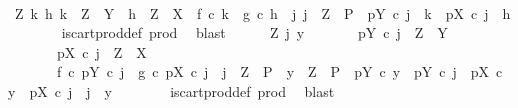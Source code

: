 \begin{isabellebody}
\ \ \ \ \isamarkupfalse%
\ {\isachardoublequoteopen}{\isasymAnd}Z\ k\ h{\isachardot}{\kern0pt}\ k\ {\isacharcolon}{\kern0pt}\ Z\ {\isasymrightarrow}\ Y\ {\isasymLongrightarrow}\ h\ {\isacharcolon}{\kern0pt}\ Z\ {\isasymrightarrow}\ X\ {\isasymLongrightarrow}\ f\ {\isasymcirc}\isactrlsub c\ k\ {\isacharequal}{\kern0pt}\ g\ {\isasymcirc}\isactrlsub c\ h\ {\isasymLongrightarrow}\ {\isasymexists}j{\isachardot}{\kern0pt}\ j\ {\isacharcolon}{\kern0pt}\ Z\ {\isasymrightarrow}\ P\ {\isasymand}\ pY\ {\isasymcirc}\isactrlsub c\ j\ {\isacharequal}{\kern0pt}\ k\ {\isasymand}\ pX\ {\isasymcirc}\isactrlsub c\ j\ {\isacharequal}{\kern0pt}\ h{\isachardoublequoteclose}\isanewline
\ \ \ \ \ \ \isamarkupfalse%
\ is{\isacharunderscore}{\kern0pt}cart{\isacharunderscore}{\kern0pt}prod{\isacharunderscore}{\kern0pt}def\ prod\ \isamarkupfalse%
\ blast\isanewline
\ \ \ \ \isamarkupfalse%
\ {\isachardoublequoteopen}{\isasymAnd}Z\ j\ y{\isachardot}{\kern0pt}\isanewline
\ \ \ \ \ \ \ pY\ {\isasymcirc}\isactrlsub c\ j\ {\isacharcolon}{\kern0pt}\ Z\ {\isasymrightarrow}\ Y\ {\isasymLongrightarrow}\isanewline
\ \ \ \ \ \ \ pX\ {\isasymcirc}\isactrlsub c\ j\ {\isacharcolon}{\kern0pt}\ Z\ {\isasymrightarrow}\ X\ {\isasymLongrightarrow}\isanewline
\ \ \ \ \ \ \ f\ {\isasymcirc}\isactrlsub c\ pY\ {\isasymcirc}\isactrlsub c\ j\ {\isacharequal}{\kern0pt}\ g\ {\isasymcirc}\isactrlsub c\ pX\ {\isasymcirc}\isactrlsub c\ j\ {\isasymLongrightarrow}\ j\ {\isacharcolon}{\kern0pt}\ Z\ {\isasymrightarrow}\ P\ {\isasymLongrightarrow}\ y\ {\isacharcolon}{\kern0pt}\ Z\ {\isasymrightarrow}\ P\ {\isasymLongrightarrow}\ pY\ {\isasymcirc}\isactrlsub c\ y\ {\isacharequal}{\kern0pt}\ pY\ {\isasymcirc}\isactrlsub c\ j\ {\isasymLongrightarrow}\ pX\ {\isasymcirc}\isactrlsub c\ y\ {\isacharequal}{\kern0pt}\ pX\ {\isasymcirc}\isactrlsub c\ j\ {\isasymLongrightarrow}\ j\ {\isacharequal}{\kern0pt}\ y{\isachardoublequoteclose}\isanewline
\ \ \ \ \ \ \isamarkupfalse%
\ is{\isacharunderscore}{\kern0pt}cart{\isacharunderscore}{\kern0pt}prod{\isacharunderscore}{\kern0pt}def\ prod\ \isamarkupfalse%
\ blast\isanewline
\ \ \isamarkupfalse%
\isanewline
{}\isamarkupfalse%
%
\endisatagproof
{\isafoldproof}%
%
\isadelimproof
%
\endisadelimproof
%
\isadelimdocument
%
\endisadelimdocument
%
\isatagdocument
%
\isamarkuptrue%
%
\endisatagdocument
{\isafolddocument}%
%
\isadelimdocument
%
\endisadelimdocument
%
\begin{isamarkuptext}%

\end{isamarkuptext}
\end{isabellebody}
